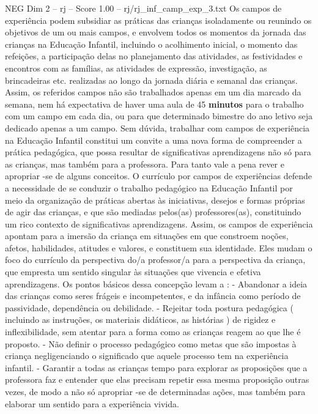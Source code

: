 \begin{textsample}{NEG Dim 2 – rj – Score 1.00 – rj/rj\_inf\_camp\_exp\_3.txt}  \label{ex:f2_neg_059}
Os campos de experiência podem subsidiar as práticas das crianças isoladamente ou reunindo os objetivos de um ou mais campos, e envolvem todos os momentos da jornada das crianças na Educação Infantil, incluindo o acolhimento inicial, o momento das refeições, a participação delas no planejamento das atividades, as festividades e encontros com as famílias, as atividades de expressão, investigação, as brincadeiras etc. realizadas ao longo da jornada diária e semanal das crianças.
Assim, os referidos campos não são trabalhados apenas em um dia marcado da semana, nem há expectativa de haver uma aula de 45 \textbf{minutos} para o trabalho com um campo em cada dia, ou para que determinado bimestre do ano letivo seja dedicado apenas a um campo.
Sem dúvida, trabalhar com campos de experiência na Educação Infantil constitui um convite a uma nova forma de compreender a prática pedagógica, que possa resultar de significativas aprendizagens não só para as crianças, mas também para a professora.
Para tanto vale a pena rever e apropriar -se de alguns conceitos.
O currículo por campos de experiências defende a necessidade de se conduzir o trabalho pedagógico na Educação Infantil por meio da organização de práticas abertas às iniciativas, desejos e formas próprias de agir das crianças, e que são mediadas pelos(as) professores(as), constituindo um rico contexto de significativas aprendizagens.
Assim, os campos de experiência apontam para a imersão da criança em situações em que constroem noções, afetos, habilidades, atitudes e valores, e constituem sua identidade.
Eles mudam o foco do currículo da perspectiva do/a professor/a para a perspectiva da criança, que empresta um sentido singular às situações que vivencia e efetiva aprendizagens.
Os pontos básicos dessa concepção levam a : - Abandonar a ideia das crianças como seres frágeis e incompetentes, e da infância como período de passividade, dependência ou debilidade. - Rejeitar toda postura pedagógica ( incluindo as instruções, os materiais didáticos, as histórias ) de rigidez e inflexibilidade, sem atentar para a forma como as crianças reagem ao que lhe é proposto. - Não definir o processo pedagógico como metas que são impostas à criança negligenciando o significado que aquele processo tem na experiência infantil. - Garantir a todas as crianças tempo para explorar as proposições que a professora faz e entender que elas precisam repetir essa mesma proposição outras vezes, de modo a não só apropriar -se de determinadas ações, mas também para elaborar um sentido para a experiência vivida.

\end{textsample}
